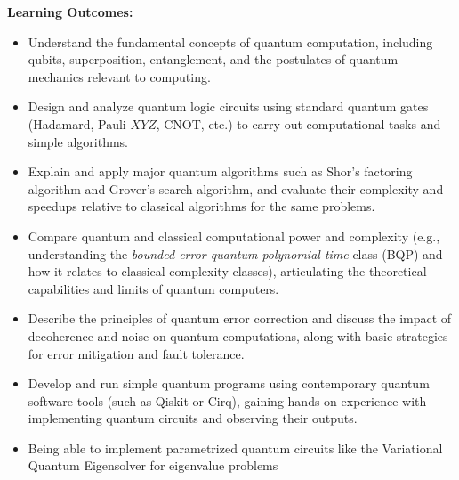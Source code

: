 \documentclass{scrreprt}
\begin{document}
\textbf{Learning Outcomes:}
\begin{itemize}
\item Understand the fundamental concepts of quantum computation, including qubits, superposition, entanglement, and the postulates of quantum mechanics relevant to computing.
\item Design and analyze quantum logic circuits using standard quantum gates (Hadamard, Pauli-$XYZ$, CNOT, etc.) to carry out computational tasks and simple algorithms.
\item Explain and apply major quantum algorithms such as Shor’s factoring algorithm and Grover’s search algorithm, and evaluate their complexity and speedups relative to classical algorithms for the same problems.
\item Compare quantum and classical computational power and complexity (e.g., understanding the \textit{bounded-error quantum polynomial time}-class (BQP) and how it relates to classical complexity classes), articulating the theoretical capabilities and limits of quantum computers.
\item Describe the principles of quantum error correction and discuss the impact of decoherence and noise on quantum computations, along with basic strategies for error mitigation and fault tolerance.
\item Develop and run simple quantum programs using contemporary quantum software tools (such as Qiskit or Cirq), gaining hands-on experience with implementing quantum circuits and observing their outputs.
\item Being able to implement parametrized quantum circuits like the Variational Quantum Eigensolver for eigenvalue problems
\end{itemize}
\begin{comment}
    \textbf{Key Topics:}
\begin{itemize}
\item Qubits and quantum states; representation of information in two-level quantum systems (Bloch sphere, state vectors, Dirac notation).
\item Quantum logic gates and the circuit model of computation; universal gate sets and circuit complexity.
\item Representative quantum algorithms (Deutsch-Jozsa, Bernstein-Vazirani, Grover’s search, Shor’s factoring, Quantum Fourier Transform) and their applications.
\item Basics of quantum computational complexity theory (notions of oracle algorithms, BQP vs. classical complexity classes, quantum supremacy concept).
\item Introduction to quantum error correction (simple codes like bit-flip and phase-flip codes, Shor’s code) and the effects of decoherence on computational reliability.
\item Practical quantum programming and experimentation using simulators or cloud-based quantum processors (writing and executing small quantum circuits).
\end{itemize}
\end{comment}
\end{document}

